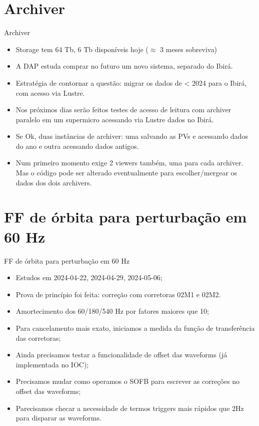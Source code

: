 \documentclass[aspectratio=169]{beamer}            %
\begin{document}
\section{Archiver}

\begin{frame}{Archiver}

{\footnotesize 
\begin{itemize}
    \setlength\itemsep{1em}
    \item Storage tem 64 Tb, 6 Tb disponíveis hoje ($\approx$ 3 meses sobreviva)
    \item A DAP estuda comprar no futuro um novo sistema, separado do Ibirá.
    \item Estratégia de contornar a questão: migrar os dados de < 2024 para o Ibirá, com acesso via Lustre.
    \item Nos próximos dias serão feitos testes de acesso de leitura com archiver paralelo em um supermicro acessando via Lustre dados no Ibirá.
    \item Se Ok, duas instâncias de archiver: uma salvando as PVs e acessando dados do ano e outra acessando dados antigos.
    \item Num primeiro momento exige 2 viewers também, uma para cada archiver. Mas o código pode ser alterado eventualmente para escolher/mergear os dados dos dois archivers.
\end{itemize}
}
        
\end{frame}



\section{FF de órbita para perturbação em 60 Hz}

\begin{frame}{FF de órbita para perturbação em 60 Hz}

\begin{itemize}
    \setlength\itemsep{1em}
    \item Estudos em 2024-04-22, 2024-04-29, 2024-05-06;
    \item Prova de princípio foi feita: correção com corretoras 02M1 e 02M2.
    \item Amortecimento dos 60/180/540 Hz por fatores maiores que 10;
    \item Para cancelamento mais exato, iniciamos a medida da função de transferência das corretoras;
    \item Ainda precisamos testar a funcionalidade de offset das waveforms (já implementada no IOC);
    \item Precisamos mudar como operamos o SOFB para escrever as correções no offset das waveforms;
    \item Parecisamos checar a necessidade de termos triggers mais rápidos que 2Hz para disparar as waveforms.
\end{itemize}
        
\end{frame}
\end{document}

